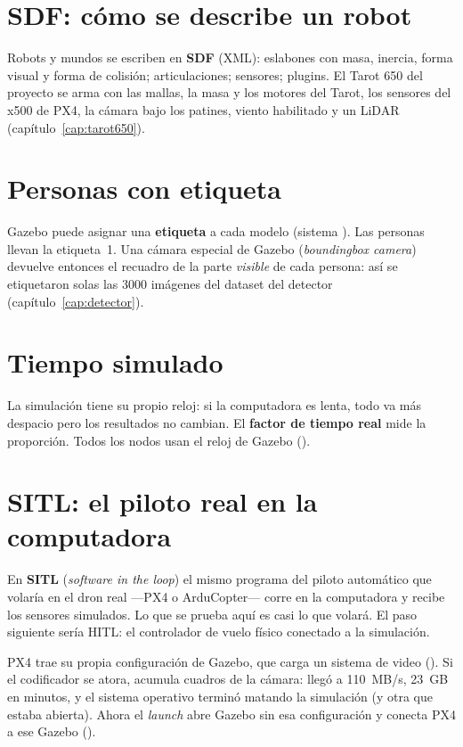 \section{SDF: cómo se describe un robot}

Robots y mundos se escriben en \textbf{SDF} (XML): eslabones con masa, inercia, forma visual y forma de
colisión; articulaciones; sensores; plugins. El Tarot 650 del proyecto se arma con las mallas, la
masa y los motores del Tarot, los sensores del x500 de PX4, la cámara bajo los patines, viento
habilitado y un LiDAR (capítulo~\ref{cap:tarot650}).

\section{Personas con etiqueta}

Gazebo puede asignar una \textbf{etiqueta} a cada modelo (sistema ). Las personas llevan la
etiqueta~1. Una cámara especial de Gazebo (\emph{boundingbox camera}) devuelve entonces el recuadro de
la parte \emph{visible} de cada persona: así se etiquetaron solas las 3000 imágenes del dataset del
detector (capítulo~\ref{cap:detector}).

\section{Tiempo simulado}

La simulación tiene su propio reloj: si la computadora es lenta, todo va más despacio pero los resultados
no cambian. El \textbf{factor de tiempo real} mide la proporción. Todos los nodos usan el reloj de
Gazebo ().

\section{SITL: el piloto real en la computadora}

En \textbf{SITL} (\emph{software in the loop}) el mismo programa del piloto automático que volaría en
el dron real ---PX4 o ArduCopter--- corre en la computadora y recibe los sensores simulados. Lo que se
prueba aquí es casi lo que volará. El paso siguiente sería HITL: el controlador de vuelo físico
conectado a la simulación.

\begin{leccion}
PX4 trae su propia configuración de Gazebo, que carga un sistema de video (). Si
el codificador se atora, acumula cuadros de la cámara: llegó a 110~MB/s, 23~GB en minutos, y el sistema
operativo terminó matando la simulación (y otra que estaba abierta). Ahora el \emph{launch} abre Gazebo
sin esa configuración y conecta PX4 a ese Gazebo ().
\end{leccion}
